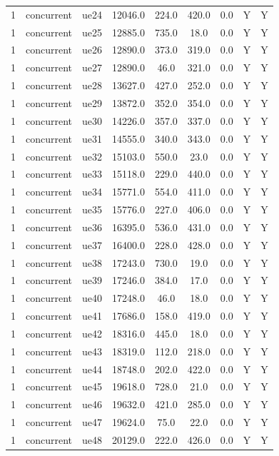 \begin{table}[ht]
\begin{tabular}{|c|c|c|c|c|c|c|c|c|}
1 & concurrent & ue24 & 12046.0 & 224.0 & 420.0 & 0.0 & Y & Y \\
1 & concurrent & ue25 & 12885.0 & 735.0 & 18.0 & 0.0 & Y & Y \\
1 & concurrent & ue26 & 12890.0 & 373.0 & 319.0 & 0.0 & Y & Y \\
1 & concurrent & ue27 & 12890.0 & 46.0 & 321.0 & 0.0 & Y & Y \\
1 & concurrent & ue28 & 13627.0 & 427.0 & 252.0 & 0.0 & Y & Y \\
1 & concurrent & ue29 & 13872.0 & 352.0 & 354.0 & 0.0 & Y & Y \\
1 & concurrent & ue30 & 14226.0 & 357.0 & 337.0 & 0.0 & Y & Y \\
1 & concurrent & ue31 & 14555.0 & 340.0 & 343.0 & 0.0 & Y & Y \\
1 & concurrent & ue32 & 15103.0 & 550.0 & 23.0 & 0.0 & Y & Y \\
1 & concurrent & ue33 & 15118.0 & 229.0 & 440.0 & 0.0 & Y & Y \\
1 & concurrent & ue34 & 15771.0 & 554.0 & 411.0 & 0.0 & Y & Y \\
1 & concurrent & ue35 & 15776.0 & 227.0 & 406.0 & 0.0 & Y & Y \\
1 & concurrent & ue36 & 16395.0 & 536.0 & 431.0 & 0.0 & Y & Y \\
1 & concurrent & ue37 & 16400.0 & 228.0 & 428.0 & 0.0 & Y & Y \\
1 & concurrent & ue38 & 17243.0 & 730.0 & 19.0 & 0.0 & Y & Y \\
1 & concurrent & ue39 & 17246.0 & 384.0 & 17.0 & 0.0 & Y & Y \\
1 & concurrent & ue40 & 17248.0 & 46.0 & 18.0 & 0.0 & Y & Y \\
1 & concurrent & ue41 & 17686.0 & 158.0 & 419.0 & 0.0 & Y & Y \\
1 & concurrent & ue42 & 18316.0 & 445.0 & 18.0 & 0.0 & Y & Y \\
1 & concurrent & ue43 & 18319.0 & 112.0 & 218.0 & 0.0 & Y & Y \\
1 & concurrent & ue44 & 18748.0 & 202.0 & 422.0 & 0.0 & Y & Y \\
1 & concurrent & ue45 & 19618.0 & 728.0 & 21.0 & 0.0 & Y & Y \\
1 & concurrent & ue46 & 19632.0 & 421.0 & 285.0 & 0.0 & Y & Y \\
1 & concurrent & ue47 & 19624.0 & 75.0 & 22.0 & 0.0 & Y & Y \\
1 & concurrent & ue48 & 20129.0 & 222.0 & 426.0 & 0.0 & Y & Y \\

\end{tabular}
\end{table}
